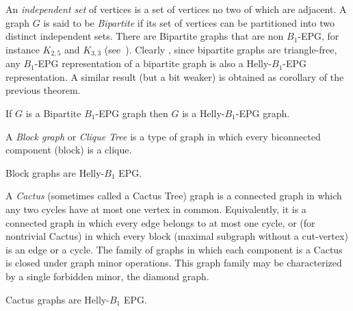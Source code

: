 An \textit{independent set} of vertices is a set of vertices no two of which are adjacent.
A graph $G$ is said to be \textit{Bipartite} if its set of vertices can be partitioned into two distinct independent sets.
 There are Bipartite graphs that are non $B_1$-EPG, for instance $K_{2,5}$ and $K_{3,3}$ (see~\cite{cohen2014}). Clearly , since
 bipartite graphs are triangle-free, any $B_1$-EPG representation of a bipartite graph is also a Helly-$B_1$-EPG representation.
 A similar result (but a bit weaker) is obtained as corollary of the previous theorem. 


\begin{corollary}
If $G$ is a Bipartite $B_1$-EPG graph then $G$ is a Helly-$B_1$-EPG graph.
\end{corollary}


A \textit{Block graph} or \textit{Clique Tree} is a type of graph in which every biconnected component (block) is a clique.

\begin{corollary}\label{lem:cdf}
 Block graphs are Helly-$B_1$ EPG.
\end{corollary}


A \textit{Cactus} (sometimes called a Cactus Tree)  graph is a connected graph in which any two  cycles have at most one vertex in common. Equivalently, it is a connected graph in which every edge belongs to at most one  cycle, or (for nontrivial Cactus) in which every block (maximal subgraph without a cut-vertex) is an edge or a cycle. The family of graphs in which each component is a Cactus is closed under graph minor operations. This graph family may be characterized by a single forbidden minor, the diamond graph.
 
\begin{corollary}
Cactus graphs are  Helly-$B_1$ EPG.
\end{corollary}

